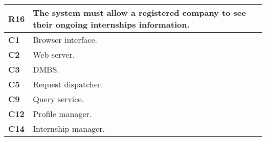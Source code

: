 \begin{table}[H]
    \centering
    \begin{tabular}{|l|m{10cm}|}
        \hline \textbf{R16} & The system must allow a registered company to see their ongoing internships information.\\
        \hline \textbf{C1} & Browser interface. \\
        \hline \textbf{C2} & Web server. \\
        \hline \textbf{C3} & DMBS. \\
        \hline \textbf{C5} & Request dispatcher. \\
        \hline \textbf{C9} & Query service. \\
        \hline \textbf{C12} & Profile manager.\\
        \hline \textbf{C14} & Internship manager. \\
        \hline
    \end{tabular}
\end{table}

